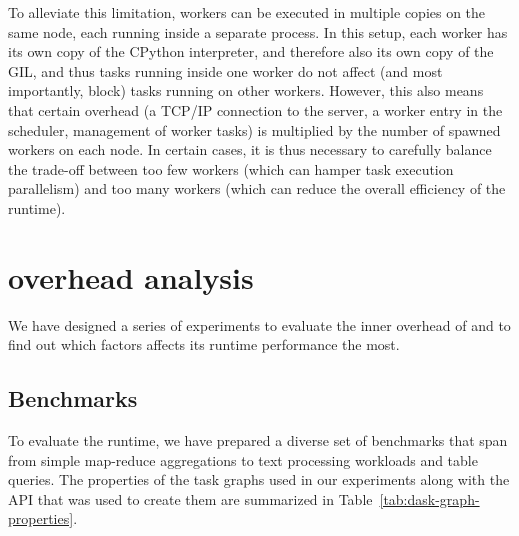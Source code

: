 To alleviate this limitation, \dask{} workers can be executed in multiple
copies on the same node, each running inside a separate process. In this setup, each worker has its
own copy of the CPython interpreter, and therefore also its own copy of the GIL, and thus tasks
running inside one worker do not affect (and most importantly, block) tasks running on other
workers. However, this also means that certain overhead (a TCP/IP connection to the server, a
worker entry in the scheduler, management of worker tasks) is multiplied by the number of spawned
workers on each node. In certain cases, it is thus necessary to carefully balance the trade-off
between too few workers (which can hamper task execution parallelism) and too many workers (which
can reduce the overall efficiency of the \dask{} runtime).

\section{\dask{} overhead analysis}
\label{sec:rsds-dask-overhead-analysis}
We have designed a series of experiments to evaluate the inner overhead of
\dask{} and to find out which factors affects its runtime performance the most.

\subsection*{Benchmarks}
To evaluate the runtime, we have prepared a diverse set of benchmarks that span from simple
map-reduce aggregations to text processing workloads and table queries. The properties of the task
graphs used in our experiments along with the \dask{} API that was used to
create them are summarized in Table~\ref{tab:dask-graph-properties}.

